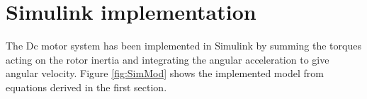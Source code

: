 %
\section{Simulink implementation}

The Dc motor system has been implemented in Simulink by summing the torques acting on the rotor inertia and integrating the angular acceleration to give angular velocity.  Figure \ref{fig:SimMod} shows the implemented model from equations derived in the first section.
%
%
%
%
%
%
%

